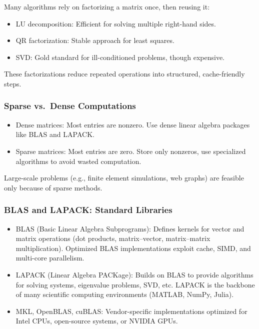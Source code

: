 \documentclass[
  letterpaper,
  DIV=11,
  numbers=noendperiod]{scrreprt}
\providecommand{\tightlist}{%
  \setlength{\itemsep}{0pt}\setlength{\parskip}{0pt}}
\begin{document}
Many algorithms rely on factorizing a matrix once, then reusing it:

\begin{itemize}
\tightlist
\item
  LU decomposition: Efficient for solving multiple right-hand sides.
\item
  QR factorization: Stable approach for least squares.
\item
  SVD: Gold standard for ill-conditioned problems, though expensive.
\end{itemize}

These factorizations reduce repeated operations into structured,
cache-friendly steps.

\subsubsection{Sparse vs.~Dense
Computations}\label{sparse-vs.-dense-computations}

\begin{itemize}
\tightlist
\item
  Dense matrices: Most entries are nonzero. Use dense linear algebra
  packages like BLAS and LAPACK.
\item
  Sparse matrices: Most entries are zero. Store only nonzeros, use
  specialized algorithms to avoid wasted computation.
\end{itemize}

Large-scale problems (e.g., finite element simulations, web graphs) are
feasible only because of sparse methods.

\subsubsection{BLAS and LAPACK: Standard
Libraries}\label{blas-and-lapack-standard-libraries}

\begin{itemize}
\tightlist
\item
  BLAS (Basic Linear Algebra Subprograms): Defines kernels for vector
  and matrix operations (dot products, matrix--vector, matrix--matrix
  multiplication). Optimized BLAS implementations exploit cache, SIMD,
  and multi-core parallelism.
\item
  LAPACK (Linear Algebra PACKage): Builds on BLAS to provide algorithms
  for solving systems, eigenvalue problems, SVD, etc. LAPACK is the
  backbone of many scientific computing environments (MATLAB, NumPy,
  Julia).
\item
  MKL, OpenBLAS, cuBLAS: Vendor-specific implementations optimized for
  Intel CPUs, open-source systems, or NVIDIA GPUs.
\end{itemize}
\end{document}
